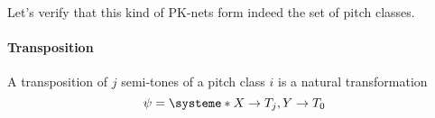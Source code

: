 \documentclass{report}
\begin{document}
Let's verify that this kind of PK-nets form indeed the set of pitch classes.

\paragraph{Transposition}

A transposition of $j$ semi-tones of a pitch class $i$ is a natural transformation $$\psi = \systeme*{X\rightarrow T_j, Y\rightarrow T_0}$$



\end{document}
